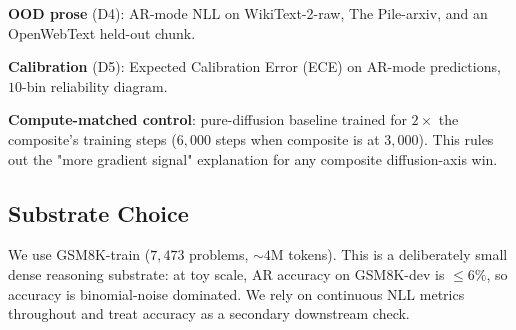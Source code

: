 \textbf{OOD prose} (D4): AR-mode NLL on WikiText-2-raw,
The Pile-arxiv, and an OpenWebText held-out chunk.

\textbf{Calibration} (D5): Expected Calibration Error (ECE) on AR-mode
predictions, $10$-bin reliability diagram.

\textbf{Compute-matched control}: pure-diffusion baseline trained for
$2\times$ the composite's training steps ($6{,}000$ steps when composite
is at $3{,}000$). This rules out the "more gradient signal" explanation
for any composite diffusion-axis win.

\subsection{Substrate Choice}

We use GSM8K-train ($7{,}473$ problems, $\sim 4$M tokens). This is a
deliberately small dense reasoning substrate: at toy scale, AR
accuracy on GSM8K-dev is $\le 6\%$, so accuracy is binomial-noise
dominated. We rely on continuous NLL metrics throughout and treat
accuracy as a secondary downstream check.
